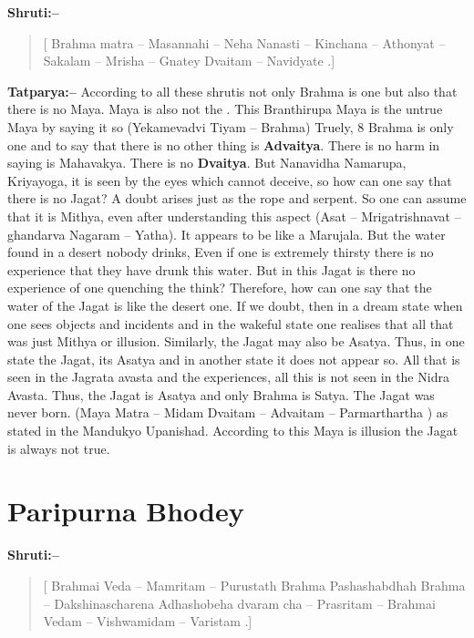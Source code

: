\textbf{Shruti:–}

\begin{verse}
[ Brahma matra – Masannahi – Neha Nanasti – Kinchana – Athonyat – Sakalam – Mrisha – Gnatey Dvaitam – Navidyate .]
\end{verse}

\textbf{Tatparya:–} According to all these shrutis not only Brahma is one but also that there is no Maya. Maya is also not the . This Branthirupa Maya is the untrue Maya by saying it so (Yekamevadvi Tiyam – Brahma) Truely, 8 Brahma is only one and to say that there is no other thing is \textbf{Advaitya}. There is no harm in saying is Mahavakya. There is no \textbf{Dvaitya}. But Nanavidha Namarupa, Kriyayoga, it is seen by the eyes which cannot deceive, so how can one say that there is no Jagat? A doubt arises just as the rope and serpent. So one can assume that it is Mithya, even after understanding this aspect (Asat – Mrigatrishnavat – ghandarva Nagaram – Yatha). It appears to be like a Marujala. But the water found in a desert nobody drinks, Even if one is extremely thirsty there is no experience that they have drunk this water. But in this Jagat is there no experience of one quenching the think? Therefore, how can one say that the water of the Jagat is like the desert one. If we doubt, then in a dream state when one sees objects and incidents and in the wakeful state one realises that all that was just Mithya or illusion. Similarly, the Jagat may also be Asatya. Thus, in one state the Jagat, its Asatya and in another state it does not appear so. All that is seen in the Jagrata avasta and the experiences, all this is not seen in the Nidra Avasta. Thus, the Jagat is Asatya and only Brahma is Satya. The Jagat was never born. (Maya Matra – Midam Dvaitam – Advaitam – Parmarthartha ) as stated in the Mandukyo Upanishad. According to this Maya is illusion the Jagat is always not true.

\chapter{Paripurna Bhodey}

\textbf{Shruti:–}

\begin{verse}
[ Brahmai Veda – Mamritam – Purustath Brahma Pashashabdhah Brahma – Dakshinascharena  Adhashobeha dvaram cha – Prasritam – Brahmai Vedam – Vishwamidam – Varistam .]
\end{verse}

